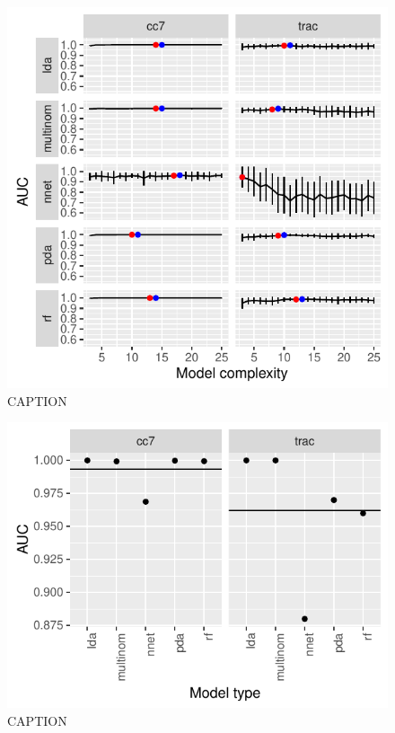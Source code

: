 \documentclass[12pt,letterpaper]{article}
\begin{document}
\begin{figure}[ht]
  \centering
  \includegraphics[height = \textheight, width = \textwidth, keepaspectratio = true]{figure/other_model_sel}
  \caption{CAPTION}
  \label{fig:other_sel}
\end{figure}

\begin{figure}[ht]
  \centering
  \includegraphics[height = \textheight, width = \textwidth, keepaspectratio = true]{figure/other_oos_sel}
  \caption{CAPTION}
  \label{fig:other_oos}
\end{figure}
\end{document}
